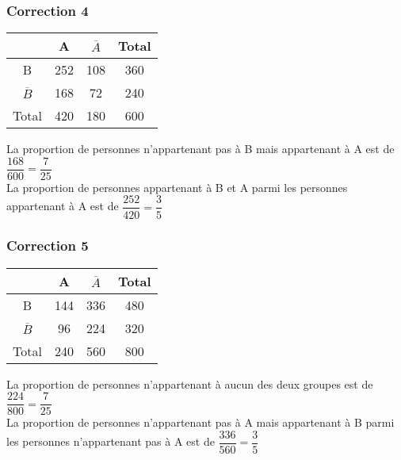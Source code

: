 \documentclass[15pt, mathserif]{beamer}
\begin{document}
\begin{frame}
\vspace{-10mm}
	\frametitle{Correction 4}
\begin{center} 
 \begin{tabular}{|c|c|c|c|} 
 \cline{2-4} 
 \multicolumn{1}{c|}{} & A & $\overline{A}$ & Total \\\hline 
 B   &252  &108& 360 \\\hline 
 $\overline{B}$   &168 & 72 & 240 \\\hline 
 Total   &420&180 &600 \\\hline  
 \end{tabular} 
 \end{center}
 La proportion de personnes n'appartenant pas à B mais appartenant à A est de $\dfrac{168}{600 }= \dfrac{7}{25}$
 \\ La proportion de personnes appartenant à B et A parmi les personnes appartenant à A est de $\dfrac{252}{420 }= \dfrac{3}{5}$
\end{frame}


\begin{frame}
\vspace{-10mm}
	\frametitle{Correction 5}
\begin{center} 
 \begin{tabular}{|c|c|c|c|} 
 \cline{2-4} 
 \multicolumn{1}{c|}{} & A & $\overline{A}$ & Total \\\hline 
 B   &144  &336& 480 \\\hline 
 $\overline{B}$   &96 & 224 & 320 \\\hline 
 Total   &240&560 &800 \\\hline  
 \end{tabular} 
 \end{center}
 La proportion de personnes n'appartenant à aucun des deux groupes est de $\dfrac{224}{800 }= \dfrac{7}{25}$
 \\ La proportion de personnes n'appartenant pas à A mais appartenant à B parmi les personnes n'appartenant pas à A est de $\dfrac{336}{560 }= \dfrac{3}{5}$
\end{frame}
\end{document}
